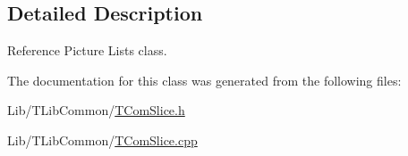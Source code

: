 \subsection{Detailed Description}
Reference Picture Lists class. 

The documentation for this class was generated from the following files\+:\begin{DoxyCompactItemize}
\item 
Lib/\+T\+Lib\+Common/\hyperlink{_t_com_slice_8h}{T\+Com\+Slice.\+h}\item 
Lib/\+T\+Lib\+Common/\hyperlink{_t_com_slice_8cpp}{T\+Com\+Slice.\+cpp}\end{DoxyCompactItemize}
